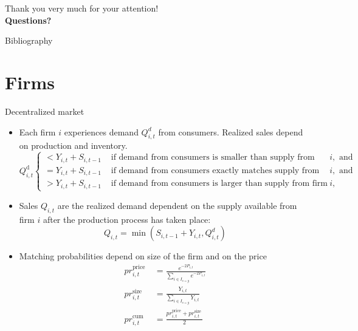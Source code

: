 \documentclass[9pt]{beamer}
\begin{document}
\begin{frame}
    \begin{center}
    {\Large Thank you very much for your attention!\\}
    \vspace{3cm}
  { \LARGE \textbf{Questions?}}
\end{center}
\end{frame}
    

\begin{frame}[allowframebreaks]{Bibliography}
    
\end{frame}


\appendix
\section{Firms}
\begin{frame}{Decentralized market}
\label{Firm}
\begin{itemize}
    \item  Each firm $i$ experiences demand $Q_{i, t}^d$ from consumers. Realized sales depend on production and inventory.
    \footnotesize
 \begin{equation} \displaystyle
Q_{i,t}^{\mathrm{d}} \begin{cases} \displaystyle <Y_{i,t}+S_{i,t-1} & \text { if demand from consumers is smaller than supply from firm } i, \text { and } \\ \displaystyle =Y_{i,t}+S_{i,t-1} & \text { if demand from consumers exactly matches supply from firm } i, \text { and } \\ \displaystyle >Y_{i,t}+S_{i,t-1} & \text { if demand from consumers is larger than supply from firm } i,\end{cases}
\end{equation}
\item  \normalsize Sales $Q_{i, t}$ are the realized demand dependent on the supply available from firm $i$ after the production process has taken place:
$$
Q_{i, t}=\min \left(S_{i, t-1}+Y_{i, t}, Q_{i, t}^d\right)
$$
\item   Matching probabilities depend on size of the firm and on the price \footnotesize \begin{equation} 
\begin{aligned}
p r _{i,t}^{\text {price }}  & =\frac{e^{-2 P _{i,t} }}{\sum_{i \in I_{s=g}} e^{-2 P _{i,t} }} \\
p r _{i,t}^{\text {size }}  & =\frac{Y _{i,t} }{\sum_{i \in I_{s=g}} Y _{i,t} } \\
p r _{i,t}^{\text {cum }}  & =\frac{p r _{i,t}^{\mathrm{price}} +p r _{i,t}^{\text {size }} }{2}
\end{aligned}
\end{equation}
\normalsize
\end{itemize}
        \hyperlink{ReturnOverview}{}
\end{frame}
\end{document}
